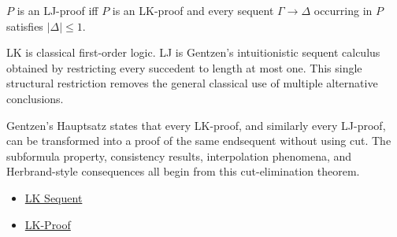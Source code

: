 \begin{remark*}
$P$ is an LJ-proof iff $P$ is an LK-proof and every sequent $\Gamma \to
\Delta$ occurring in $P$ satisfies $|\Delta| \leq 1$.
\end{remark*}

\begin{remark*}[Interpretation]
LK is classical first-order logic. LJ is Gentzen's intuitionistic sequent
calculus obtained by restricting every succedent to length at most one. This
single structural restriction removes the general classical use of multiple
alternative conclusions.
\end{remark*}

\begin{remark*}[Exposition]
Gentzen's Hauptsatz states that every LK-proof, and similarly every LJ-proof,
can be transformed into a proof of the same endsequent without using cut. The
subformula property, consistency results, interpolation phenomena, and
Herbrand-style consequences all begin from this cut-elimination theorem.
\end{remark*}

\begin{dependencies}
\begin{itemize}
  \item \hyperref[def:lk-sequent]{LK Sequent}
  \item \hyperref[def:lk-proof]{LK-Proof}
\end{itemize}
\end{dependencies}
